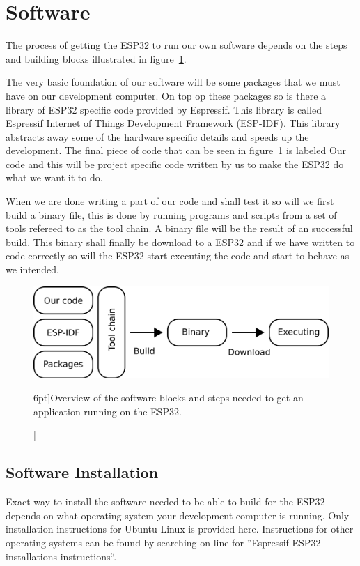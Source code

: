 \documentclass{tufte-book}
\begin{document}
	\section{Software}\label{sec:software}
	
	The process of getting the ESP32 to run our own software depends on the steps and building blocks illustrated in figure~\ref{fig:software_anatomy}.
	
	The very basic foundation of our software will be some packages that we must have on our development computer. On top op these packages so is there a library of ESP32 specific code provided by Espressif. This library is called Espressif Internet of Things Development Framework (ESP-IDF). This library abstracts away some of the hardware specific details and speeds up the development. The final piece of code that can be seen in figure~\ref{fig:software_anatomy} is labeled Our code and this will be project specific code written by us to make the ESP32 do what we want it to do.
	
	When we are done writing a part of our code and shall test it so will we first build a binary file, this is done by running programs and scripts from a set of tools refereed to as the tool chain. A binary file will be the result of an successful build. This binary shall finally be download to a ESP32 and if we have written to code correctly so will the ESP32 start executing the code and start to behave as we intended. 
	
	\begin{figure}
		\includegraphics{software_anatomy.png}
		\caption[Software development $n$.][6pt]{Overview of the software blocks and steps needed to get an application running on the ESP32.}
		\label{fig:software_anatomy}
	\end{figure}
	
	\subsection{Software Installation}
	Exact way to install the software needed to be able to build for the ESP32 depends on what operating system your development computer is running.
	Only installation instructions for Ubuntu Linux is provided here. Instructions for other operating systems can be found by searching on-line for ''Espressif ESP32 installations instructions``.
	
\end{document}
